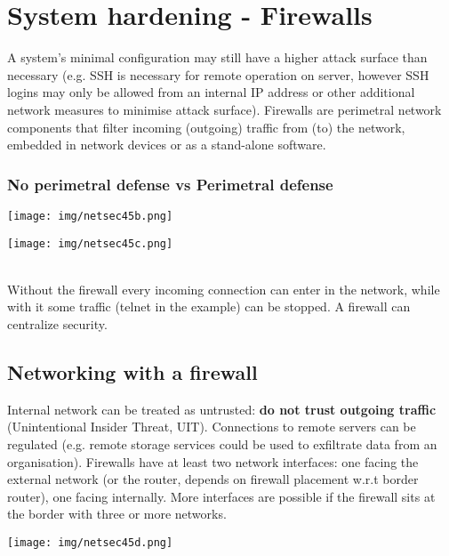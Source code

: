 \documentclass[a4paper, 10pt, titlepage]{article}
\begin{document}
\newpage
\section{System hardening - Firewalls}
A system’s minimal configuration may still have a higher attack surface than necessary (e.g. SSH is necessary for remote operation on server, however SSH logins may only be allowed from an internal IP address or other additional network measures to minimise attack surface).
Firewalls are perimetral network components that filter incoming (outgoing) traffic from (to) the network, embedded in network devices or as a stand-alone software. 


\subsubsection*{No perimetral defense vs Perimetral defense}
\begin{minipage}{0.48\textwidth} 
	\begin{center}
		\texttt{[image: img/netsec45b.png]}
	\end{center}
\end{minipage}
\hfill \vline
\begin{minipage}{0.48\textwidth}
	\begin{center}
		\texttt{[image: img/netsec45c.png]}
	\end{center}
\end{minipage} \medskip\\
Without the firewall every incoming connection can enter in the network, while with it some traffic (telnet in the example) can be stopped. A firewall can centralize security.

\subsection*{Networking with a firewall}
\begin{minipage}{0.6\textwidth} 
Internal network can be treated as untrusted: \textbf{do not trust outgoing traffic} (Unintentional Insider Threat, UIT). Connections to remote servers can be regulated (e.g. remote storage services could be used to exfiltrate data from an organisation).
Firewalls have at least two network interfaces: one facing the external network (or the router, depends on firewall placement w.r.t border router), one facing internally. More interfaces are possible if the firewall sits at the border with three or more networks.
\end{minipage}
\hfill 
\begin{minipage}{0.35\textwidth}
	\begin{center}
		\texttt{[image: img/netsec45d.png]}
	\end{center}
\end{minipage}
\end{document}
